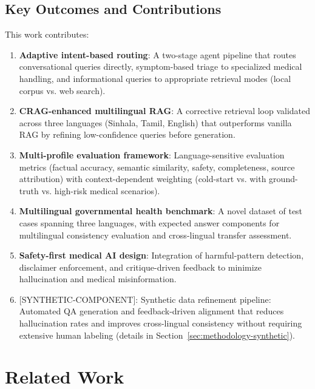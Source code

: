 \documentclass[11pt,a4paper]{article}
\newcommand{\synthetic}[1]{{\colorbox{syntheticcolor}{[SYNTHETIC-COMPONENT]: #1}}}
\begin{document}
\subsection{Key Outcomes and Contributions}
\label{sec:outcomes}

This work contributes:

\begin{enumerate}
    \item \textbf{Adaptive intent-based routing}: A two-stage agent pipeline that routes conversational queries directly, symptom-based triage to specialized medical handling, and informational queries to appropriate retrieval modes (local corpus vs. web search).
    
    \item \textbf{CRAG-enhanced multilingual RAG}: A corrective retrieval loop validated across three languages (Sinhala, Tamil, English) that outperforms vanilla RAG by refining low-confidence queries before generation.
    
    \item \textbf{Multi-profile evaluation framework}: Language-sensitive evaluation metrics (factual accuracy, semantic similarity, safety, completeness, source attribution) with context-dependent weighting (cold-start vs. with ground-truth vs. high-risk medical scenarios).
    
    \item \textbf{Multilingual governmental health benchmark}: A novel dataset of test cases spanning three languages, with expected answer components for multilingual consistency evaluation and cross-lingual transfer assessment.
    
    \item \textbf{Safety-first medical AI design}: Integration of harmful-pattern detection, disclaimer enforcement, and critique-driven feedback to minimize hallucination and medical misinformation.
    
    \item \synthetic{Synthetic data refinement pipeline}: Automated QA generation and feedback-driven alignment that reduces hallucination rates and improves cross-lingual consistency without requiring extensive human labeling (details in Section~\ref{sec:methodology-synthetic}).
\end{enumerate}

\section{Related Work}
\end{document}
